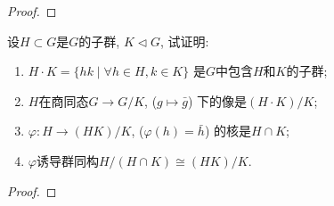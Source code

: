 \begin{proof}
    
\end{proof}

\begin{problem}
    设$H \subset G$是$G$的子群, $K \lhd G$, 试证明: 
\begin{enumerate}[(1)]
    \item $H \cdot K = \{hk \mid \forall h \in H, k \in K\}$
是$G$中包含$H$和$K$的子群;
    \item $H$在商同态$G \to G/K$, ($g \mapsto \bar{g}$)
下的像是$(H \cdot K)/K$;
    \item $\varphi:H \to (HK)/K$, ($\varphi(h) = \bar{h}$)
的核是$H \cap K$;
    \item $\varphi$诱导群同构$H/(H \cap K) \cong (HK)/K$.
\end{enumerate}
\end{problem}

\begin{proof}
    
\end{proof}